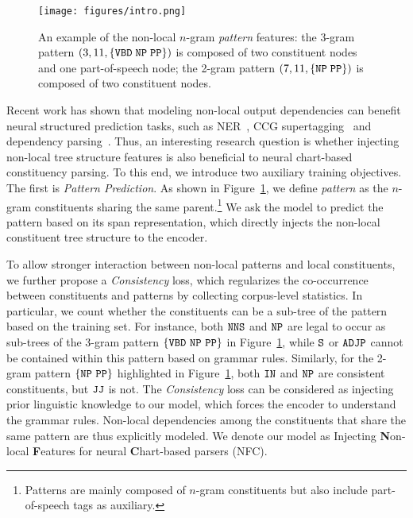 \documentclass[11pt]{article}
\begin{document}
\begin{figure}
    \centering
    \texttt{[image: figures/intro.png]}
    \caption{An example of the non-local $n$-gram {\it pattern} features: the 3-gram pattern $(3, 11, {\tt \{VBD \; NP \; PP\}})$ is composed of two constituent nodes and one part-of-speech node; the 2-gram pattern $(7, 11, {\tt \{NP \; PP\}})$ is composed of two constituent nodes. }
    \label{fig:intro}
\end{figure}


Recent work has shown that modeling non-local output dependencies can benefit neural structured prediction tasks, such as NER~\cite{lstm-crf}, CCG supertagging~\cite{lan} and dependency parsing~\cite{zhang-etal-2020-efficient}. 
Thus, an interesting research question is whether injecting non-local tree structure features is also beneficial to neural chart-based constituency parsing. 
To this end, we introduce two auxiliary training objectives. 
The first is {\it Pattern Prediction}. 
As shown in Figure~\ref{fig:intro}, we define {\it pattern} as the $n$-gram constituents sharing the same parent.\footnote{Patterns are mainly composed of $n$-gram constituents but also include part-of-speech tags as auxiliary.} We ask the model to predict the pattern based on its span representation, which directly injects the non-local constituent tree structure to the encoder. 


To allow stronger interaction between non-local patterns and local constituents, 
we further propose a {\it Consistency} loss, which regularizes the co-occurrence between constituents and patterns by collecting corpus-level statistics. In particular, we count whether the constituents can be a sub-tree of the pattern based on the training set.
For instance, both ${\tt NNS}$ and ${\tt NP}$ are legal to occur as sub-trees of the 3-gram pattern ${\{\tt VBD \ NP \ PP\}}$ in Figure~\ref{fig:intro}, while ${\tt S}$ or ${\tt ADJP}$ cannot be contained within this pattern based on grammar rules.
Similarly, for the 2-gram pattern ${\{\tt NP \ PP\}}$ highlighted in Figure~\ref{fig:intro}, both ${\tt IN}$ and ${\tt NP}$ are consistent constituents, but ${\tt JJ}$ is not.
The {\it Consistency} loss can be considered as injecting prior linguistic knowledge to our model, which forces the encoder to understand the grammar rules.  
Non-local dependencies among the constituents that share the same pattern are thus explicitly modeled. 
We denote our model as Injecting {\bf N}on-local {\bf F}eatures for neural {\bf C}hart-based parsers (NFC).
\end{document}
